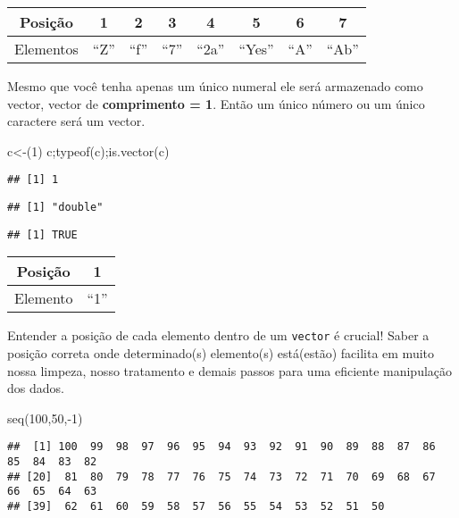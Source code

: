 \documentclass[
]{book}
\newenvironment{Shaded}{\begin{snugshade}}{\end{snugshade}}
\newcommand{\DecValTok}[1]{\textcolor[rgb]{0.00,0.00,0.81}{#1}}
\newcommand{\FunctionTok}[1]{\textcolor[rgb]{0.00,0.00,0.00}{#1}}
\newcommand{\NormalTok}[1]{#1}
\newcommand{\OtherTok}[1]{\textcolor[rgb]{0.56,0.35,0.01}{#1}}
\newcommand{\SpecialCharTok}[1]{\textcolor[rgb]{0.00,0.00,0.00}{#1}}
\begin{document}
\begin{longtable}[]{@{}cccccccc@{}}
\toprule
Posição & 1 & 2 & 3 & 4 & 5 & 6 & 7 \\
\midrule
\endhead
Elementos & ``Z'' & ``f'' & ``7'' & ``2a'' & ``Yes'' & ``A'' & ``Ab'' \\
\bottomrule
\end{longtable}

Mesmo que você tenha apenas um único numeral ele será armazenado como vector, vector de \textbf{comprimento = 1}.
Então um único número ou um único caractere será um vector.

\begin{Shaded}
\begin{Highlighting}[]
\NormalTok{c}\OtherTok{\textless{}{-}}\NormalTok{(}\DecValTok{1}\NormalTok{)}
\NormalTok{c;}\FunctionTok{typeof}\NormalTok{(c);}\FunctionTok{is.vector}\NormalTok{(c)}
\end{Highlighting}
\end{Shaded}

\begin{verbatim}
## [1] 1
\end{verbatim}

\begin{verbatim}
## [1] "double"
\end{verbatim}

\begin{verbatim}
## [1] TRUE
\end{verbatim}

\begin{longtable}[]{@{}cc@{}}
\toprule
Posição & 1 \\
\midrule
\endhead
Elemento & ``1'' \\
\bottomrule
\end{longtable}

Entender a posição de cada elemento dentro de um \texttt{vector} é crucial! Saber a posição correta onde determinado(s) elemento(s) está(estão) facilita em muito nossa limpeza, nosso tratamento e demais passos para uma eficiente manipulação dos dados.

\begin{Shaded}
\begin{Highlighting}[]
\FunctionTok{seq}\NormalTok{(}\DecValTok{100}\NormalTok{,}\DecValTok{50}\NormalTok{,}\SpecialCharTok{{-}}\DecValTok{1}\NormalTok{)}
\end{Highlighting}
\end{Shaded}

\begin{verbatim}
##  [1] 100  99  98  97  96  95  94  93  92  91  90  89  88  87  86  85  84  83  82
## [20]  81  80  79  78  77  76  75  74  73  72  71  70  69  68  67  66  65  64  63
## [39]  62  61  60  59  58  57  56  55  54  53  52  51  50
\end{verbatim}
\end{document}
